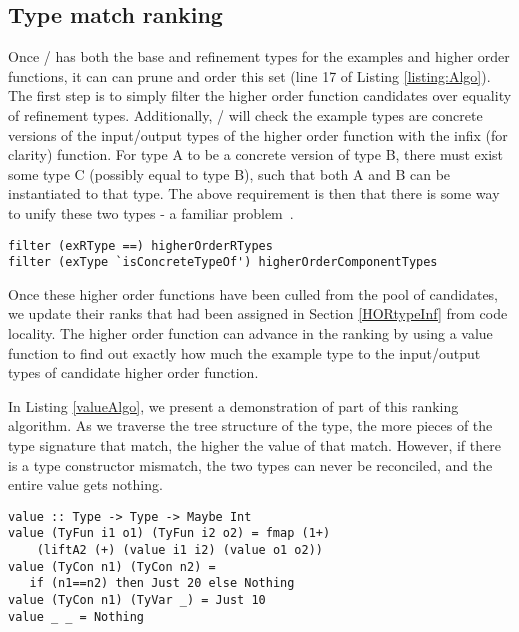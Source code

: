 \subsection{Type match ranking}\label{typeMatch}

Once \ourTool/ has both the base and refinement types for the examples and higher order functions, it can can prune and order this set (line 17 of Listing \ref{listing:Algo}).
The first step is to simply filter the higher order function candidates over equality of refinement types.
Additionally, \ourTool/ will check the example types are concrete versions of the input/output types of the higher order function with the infix (for clarity)  function.
For type A to be a concrete version of type B, there must exist some type C (possibly equal to type B), such that both A and B can be instantiated to that type.
The above requirement is then that there is some way to unify these two types - a familiar problem~\cite{typeUnif}.

\begin{lstlisting}[caption=Pruning based on types]
filter (exRType ==) higherOrderRTypes
filter (exType `isConcreteTypeOf') higherOrderComponentTypes
\end{lstlisting}

Once these higher order functions have been culled from the pool of candidates, we update their ranks that had been assigned in Section \ref{HORtypeInf} from code locality.
The higher order function can advance in the ranking by using a value function to find out exactly how much the example type  to the input/output types of candidate higher order function.

In Listing \ref{valueAlgo}, we present a demonstration of part of this ranking algorithm.
As we traverse the tree structure of the type, the more pieces of the type signature that match, the higher the value of that match. 
However, if there is a type constructor mismatch, the two types can never be reconciled, and the entire value gets nothing.

\begin{lstlisting}[caption=Type closeness ranking algorithm (sample),label=valueAlgo]
value :: Type -> Type -> Maybe Int
value (TyFun i1 o1) (TyFun i2 o2) = fmap (1+) 
    (liftA2 (+) (value i1 i2) (value o1 o2))
value (TyCon n1) (TyCon n2) =
   if (n1==n2) then Just 20 else Nothing
value (TyCon n1) (TyVar _) = Just 10
value _ _ = Nothing
\end{lstlisting}

